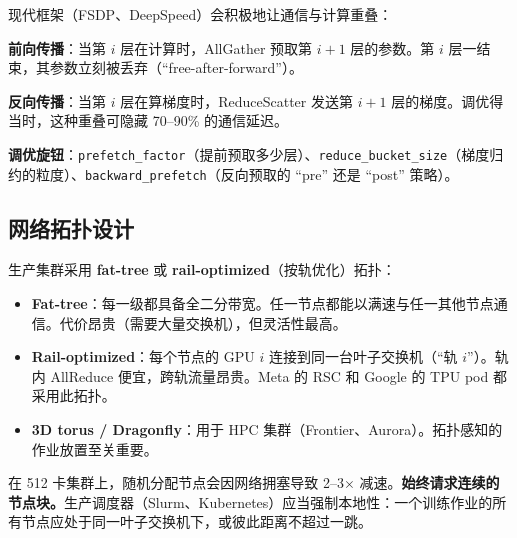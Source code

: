 \newpage
\begin{intuitionbox}[通信-计算重叠]
现代框架（FSDP、DeepSpeed）会积极地让通信与计算重叠：

\textbf{前向传播}：当第 $i$ 层在计算时，AllGather 预取第 $i+1$ 层的参数。第 $i$ 层一结束，其参数立刻被丢弃（``free-after-forward''）。

\textbf{反向传播}：当第 $i$ 层在算梯度时，ReduceScatter 发送第 $i+1$ 层的梯度。调优得当时，这种重叠可隐藏 70--90\% 的通信延迟。

\textbf{调优旋钮}：\texttt{prefetch\_factor}（提前预取多少层）、\texttt{reduce\_bucket\_size}（梯度归约的粒度）、\texttt{backward\_prefetch}（反向预取的 ``pre'' 还是 ``post'' 策略）。
\end{intuitionbox}

\subsection{网络拓扑设计}
\label{network-topology-design}

生产集群采用 \textbf{fat-tree} 或 \textbf{rail-optimized}（按轨优化）拓扑：

\begin{itemize}
  \item \textbf{Fat-tree}：每一级都具备全二分带宽。任一节点都能以满速与任一其他节点通信。代价昂贵（需要大量交换机），但灵活性最高。
  \item \textbf{Rail-optimized}：每个节点的 GPU $i$ 连接到同一台叶子交换机（``轨 $i$''）。轨内 AllReduce 便宜，跨轨流量昂贵。Meta 的 RSC 和 Google 的 TPU pod 都采用此拓扑。
  \item \textbf{3D torus / Dragonfly}：用于 HPC 集群（Frontier、Aurora）。拓扑感知的作业放置至关重要。
\end{itemize}

\begin{warningbox}[作业放置很重要]
在 512 卡集群上，随机分配节点会因网络拥塞导致 2--3$\times$ 减速。\textbf{始终请求连续的节点块。}生产调度器（Slurm、Kubernetes）应当强制本地性：一个训练作业的所有节点应处于同一叶子交换机下，或彼此距离不超过一跳。
\end{warningbox}

